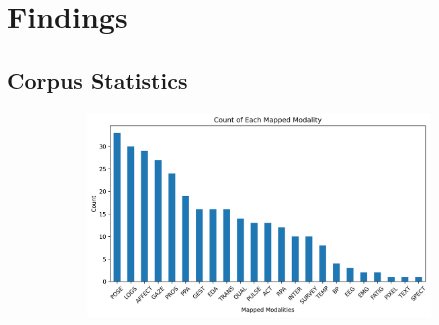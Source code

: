 \documentclass[manuscript,screen,review]{acmart}
\begin{document}
\section{Findings} \label{sec:findings} 

\subsection{Corpus Statistics}


\begin{figure}[h!]
    \centering

    
    
    \begin{subfigure}[b]{0.45\textwidth}
        \includegraphics[width=\textwidth]{img/statistical_imgs/modalities.png}
        
        

\end{subfigure}
\end{figure}
\end{document}
